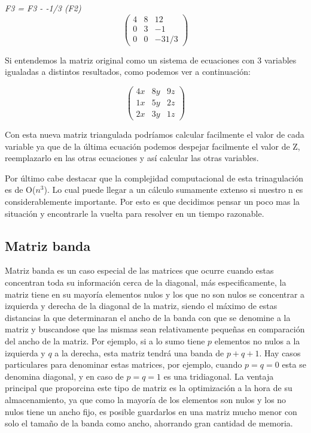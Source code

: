 \emph{F3 = F3 - -1/3 (F2) } 
\[ \left( \begin{array}{ccc}
4 & 8 & 12 \\
0 & 3 & -1 \\
0 & 0 & -31/3 \end{array} \right)\] 

Si entendemos la matriz original como un sistema de ecuaciones con 3 variables igualadas a distintos resultados, como podemos ver a continuación:

\[ \left( \begin{array}{ccc}
4x & 8y & 9z \\
1x & 5y & 2z \\
2x & 3y & 1z \end{array} \right)\] 

Con esta nueva matriz triangulada podríamos calcular facilmente el valor de cada variable ya que de la última ecuación podemos despejar facilmente el valor de Z, reemplazarlo en las otras ecuaciones y así calcular las otras variables.


\newpage

Por último cabe destacar que la complejidad computacional de esta trinagulación es de O($n^3$). Lo cual puede llegar a un cálculo sumamente extenso si nuestro n es considerablemente importante. Por esto es que decidimos pensar un poco mas la situación y encontrarle la vuelta para resolver en un tiempo razonable.

\subsection{Matriz banda}

Matriz banda es un caso especial de las matrices que ocurre cuando estas concentran toda su información cerca de la diagonal, más especificamente, la matriz tiene en su mayoría elementos nulos y los que no son nulos se concentrar a izquierda y derecha de la diagonal de la matriz, siendo el máximo de estas distancias la que determinaran el ancho de la banda con que se denomine a la matriz y buscandose que las mismas sean relativamente pequeñas en comparación del ancho de la matriz. Por ejemplo, si a lo sumo tiene $p$ elementos no nulos a la izquierda y $q$ a la derecha, esta matriz tendrá una banda de $p+q+1$. Hay casos particulares para denominar estas matrices, por ejemplo, cuando $p = q = 0$ esta se denomina diagonal, y en caso de $p = q = 1$  es una tridiagonal.
La ventaja principal que proporcina este tipo de matriz es la optimización a la hora de su almacenamiento, ya que como la mayoría de los elementos son nulos y los no nulos tiene un ancho fijo, es posible guardarlos en una matriz mucho menor con solo el tamaño de la banda como ancho, ahorrando gran cantidad de memoria.

